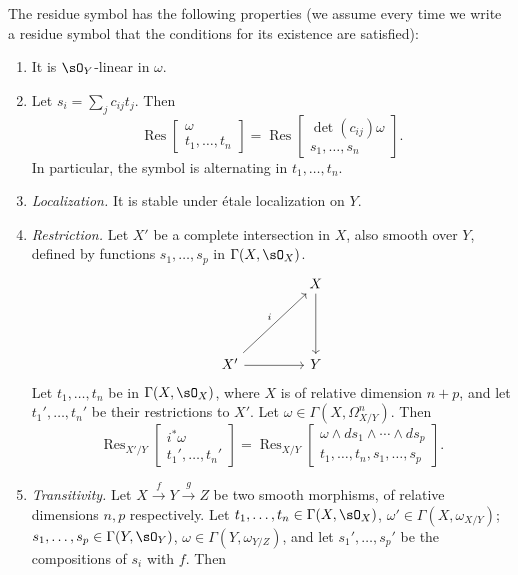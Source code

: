 The residue symbol has the following properties (we assume every time we write a residue symbol that the conditions for its existence are satisfied):

\begin{enumerate}
\item[(R0)]\label{res:R0} It is $\sO_Y$-linear in $\omega$.
\item[(R1)]\label{res:R1} Let $s_i=\sum_j c_{ij}t_j$. Then
\[
\operatorname{Res}\begin{bmatrix} \omega \\ t_1,\dots,t_n \end{bmatrix} = \operatorname{Res}\begin{bmatrix} \det(c_{ij})\omega \\ s_1,\dots,s_n \end{bmatrix}.
\]
In particular, the symbol is alternating in $t_1,\dots,t_n$.
\item[(R2)]\label{res:R2} \emph{Localization.} It is stable under \'etale localization on $Y$.
\item[(R3)]\label{res:R3} \emph{Restriction.} Let $X'$ be a complete intersection in $X$, also smooth over $Y$, defined by functions $s_1,\dots,s_p$ in $\Gamma(X,\sO_X)$.
\[
\begin{tikzcd}[row sep=1.5cm, column sep=1.5cm]
	& X \arrow[d] \\
	X' \arrow[ur, "i"] \arrow[r] & Y
\end{tikzcd}
\]
Let $t_1,\dots,t_n$ be in $\Gamma(X,\sO_X)$, where $X$ is of relative dimension $n+p$, and let $t_1',\dots,t_n'$ be their restrictions to $X'$. Let $\omega\in\Gamma(X,\Omega_{X/Y}^n)$. Then
\[
\operatorname{Res}_{X'/Y}\begin{bmatrix} i^*\omega \\ t_1',\dots,t_n' \end{bmatrix} = \operatorname{Res}_{X/Y}\begin{bmatrix} \omega\wedge ds_1\wedge\cdots\wedge ds_p \\ t_1,\dots,t_n,s_1,\dots,s_p \end{bmatrix}.
\]
\item[(R4)]\label{res:R4} \emph{Transitivity.} Let $X\xrightarrow{f} Y\xrightarrow{g} Z$ be two smooth morphisms, of relative dimensions $n,p$ respectively. Let $t_1,\dots,t_n\in\Gamma(X,\sO_X)$, $\omega'\in\Gamma(X,\omega_{X/Y})$; $s_1,\dots,s_p\in\Gamma(Y,\sO_Y)$, $\omega\in\Gamma(Y,\omega_{Y/Z})$, and let $s_1',\dots,s_p'$ be the compositions of $s_i$ with $f$. Then

\end{enumerate}

